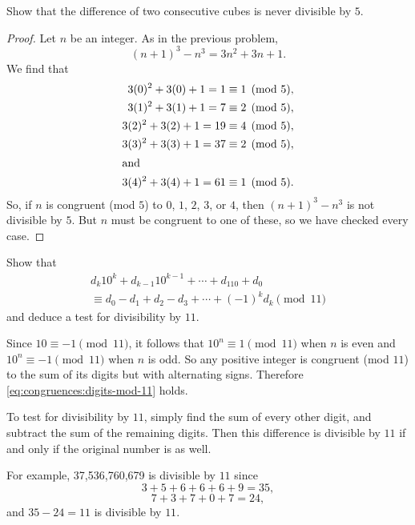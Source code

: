  Show that the difference of two consecutive cubes is
never divisible by $5$.
\begin{proof}
  Let $n$ be an integer. As in the previous problem,
  \begin{equation*}
    (n+1)^3 - n^3 = 3n^2 + 3n + 1.
  \end{equation*}
  We find that
  \begin{align*}
    3(0)^2 + 3(0) + 1 = 1 &\equiv1\pmod5, \\
    3(1)^2 + 3(1) + 1 = 7 &\equiv2\pmod5, \\
    3(2)^2 + 3(2) + 1 = 19 &\equiv4\pmod5, \\
    3(3)^2 + 3(3) + 1 = 37 &\equiv2\pmod5, \\
    \intertext{and}
    3(4)^2 + 3(4) + 1 = 61 &\equiv1\pmod5.
  \end{align*}
  So, if $n$ is congruent (mod $5$) to $0$, $1$, $2$, $3$, or $4$,
  then $(n+1)^3-n^3$ is not divisible by $5$. But $n$ must be
  congruent to one of these, so we have checked every case.
\end{proof}

\label{problem:congruences:11-divisibility}
Show that
\begin{multline}
  \label{eq:congruences:digits-mod-11}
  d_k10^k + d_{k-1}10^{k-1} + \cdots + d_110 + d_0 \\
  \equiv d_0 - d_1 + d_2 - d_3 + \cdots + (-1)^kd_k\pmod{11}
\end{multline}
and deduce a test for divisibility by $11$.
\begin{solution}
  Since $10\equiv-1\pmod{11}$, it follows that $10^n\equiv1\pmod{11}$
  when $n$ is even and $10^n\equiv-1\pmod{11}$ when $n$ is odd. So any
  positive integer is congruent (mod $11$) to the sum of its digits
  but with alternating signs. Therefore
  \eqref{eq:congruences:digits-mod-11} holds.

  To test for divisibility by $11$, simply find the sum of every other
  digit, and subtract the sum of the remaining digits. Then this
  difference is divisible by $11$ if and only if the original number
  is as well.

  For example, 37,536,760,679 is divisible by $11$ since
  \begin{equation*}
    3 + 5 + 6 + 6 + 6 + 9 = 35,
  \end{equation*}
  \begin{equation*}
    7 + 3 + 7 + 0 + 7 = 24,
  \end{equation*}
  and $35 - 24 = 11$ is divisible by $11$.
\end{solution}

